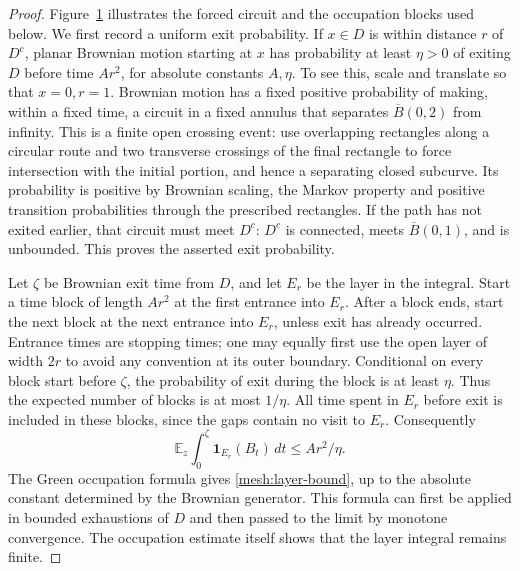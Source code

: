 \begin{proof}
Figure~\ref{fig:brownian-circuit} illustrates the forced circuit and
the occupation blocks used below. We first record a uniform exit probability.  If $x\in D$ is within
distance $r$ of $D^c$, planar Brownian motion starting at $x$ has
probability at least $\eta>0$ of exiting $D$ before time $Ar^2$, for
absolute constants $A,\eta$.  To see this, scale and translate so that
$x=0,r=1$.  Brownian motion has a fixed positive probability of making,
within a fixed time, a circuit in a fixed annulus that separates
$\overline B(0,2)$ from infinity.  This is a finite open crossing event:
use overlapping rectangles along a circular route and two transverse
crossings of the final rectangle to force intersection with the
initial portion, and hence a separating closed subcurve.  Its
probability is positive by Brownian scaling, the Markov property and
positive transition probabilities through the prescribed rectangles.
If the path has not exited earlier, that circuit must meet $D^c$:
$D^c$ is connected, meets $\overline B(0,1)$, and is unbounded.  This
proves the asserted exit probability.

Let $\zeta$ be Brownian exit time from $D$, and let $E_r$ be the layer
in the integral.  Start a time block of length $Ar^2$ at the first
entrance into $E_r$.  After a block ends, start the next block at the
next entrance into $E_r$, unless exit has already occurred.  Entrance
times are stopping times; one may equally first use the open layer of
width $2r$ to avoid any convention at its outer boundary.  Conditional
on every block start before $\zeta$, the probability of exit during
the block is at least $\eta$.  Thus the expected number of blocks is
at most $1/\eta$.  All time spent in $E_r$ before exit is included in
these blocks, since the gaps contain no visit to $E_r$.  Consequently
\[
 \mathbb E_z\int_0^\zeta\mathbf1_{E_r}(B_t)\,dt
 \le Ar^2/\eta.
\]
The Green occupation formula gives \eqref{mesh:layer-bound}, up to the
absolute constant determined by the Brownian generator.  This formula
can first be applied in bounded exhaustions of $D$ and then passed to
the limit by monotone convergence.  The occupation estimate itself
shows that the layer integral remains finite.
\end{proof}

\begin{figure}[tbp]
\centering

\caption{\BrownianCircuitCaption}
\label{fig:brownian-circuit}
\end{figure}
\clearpage

